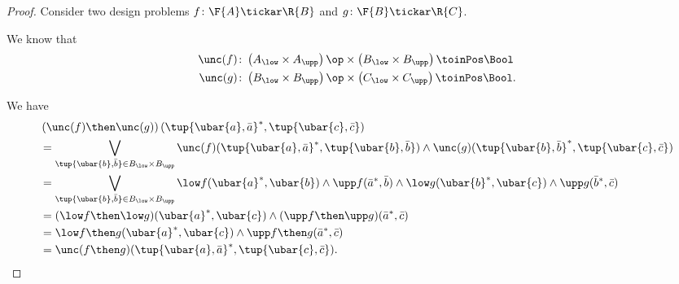 \begin{proof}
Consider two design problems $f\colon \F{A}\tickar \R{B}$ and $g\colon \F{B}\tickar \R{C}$. 

We know that
\begin{equation}
    \begin{aligned}
    \unc(f)&\colon \left( A_{\low}\times A_{\upp}\right)\op \times \left( B_{\low}\times B_{\upp}\right)\toinPos \Bool\\
    \unc(g)&\colon \left( B_{\low}\times B_{\upp}\right)\op \times \left( C_{\low}\times C_{\upp}\right)\toinPos \Bool.
    \end{aligned}
\end{equation}

We have
\begin{equation}
    \begin{aligned}
    &\left(\unc(f)\then \unc(g)\right) (\tup{\ubar{a},\bar{a}}^*,\tup{\ubar{c},\bar{c}})\\
    &=\bigvee_{\tup{\ubar{b},\bar{b}}\in B_{\low}\times B_{\upp}} \unc(f)(\tup{\ubar{a},\bar{a}}^*,\tup{\ubar{b},\bar{b}})\wedge \unc(g)(\tup{\ubar{b},\bar{b}}^*,\tup{\ubar{c},\bar{c}})\\
    &= \bigvee_{\tup{\ubar{b},\bar{b}}\in B_{\low}\times B_{\upp}} \low f(\ubar{a}^*,\ubar{b})\wedge \upp f(\bar{a}^*,\bar{b})\wedge \low g(\ubar{b}^*,\ubar{c})\wedge \upp g(\bar{b}^*,\bar{c})\\
    &=(\low f\then \low g)(\ubar{a}^*,\ubar{c})\wedge (\upp f\then \upp g)(\bar{a}^*,\bar{c})\\
    &=\low f\then g (\ubar{a}^*,\ubar{c})\wedge \upp f\then g(\bar{a}^*,\bar{c})\\
    &=\unc(f\then g)(\tup{\ubar{a},\bar{a}}^*,\tup{\ubar{c},\bar{c}}).
    \end{aligned}
\end{equation}
\end{proof}


